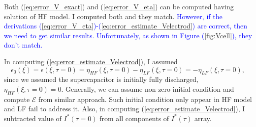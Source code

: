 \documentclass[]{article}
\newcommand{\blue}[1]{\textcolor{blue}{#1}}
\begin{document}
Both (\ref{eq:error_V_exact}) and (\ref{eq:error_V_eta}) can be computed having solution of HF model. I computed both and they match.
\blue{
However, if the derivations (\ref{eq:error_V_eta})-(\ref{eq:error_estimate_Velectrod}) are correct, then we need to get similar results. Unfortunately, as shown in Figure (\ref{fig:Vcell}), they don't match. 
}

In computing (\ref{eq:error_estimate_Velectrod}), I assumed
\begin{equation}
\epsilon_0(\xi) = \epsilon(\xi,\tau=0) = \eta_{HF}(\xi,\tau=0) - \eta_{LF}(\xi,\tau=0) = -\eta_{LF}(\xi,\tau=0),
\end{equation} 
%
since we assumed the supercapacitor is initially fully discharged, $\eta_{HF}(\xi,\tau=0) = 0$. Generally, we can assume non-zero initial condition and compute $\mathcal{E}$ from similar approach. Such initial condition only appear in HF model and LF fail to address it.  
Also, in computing (\ref{eq:error_estimate_Velectrod}), I subtracted value of $I^*(\tau=0)$ from all components of $I^*(\tau)$ array.
\end{document}
